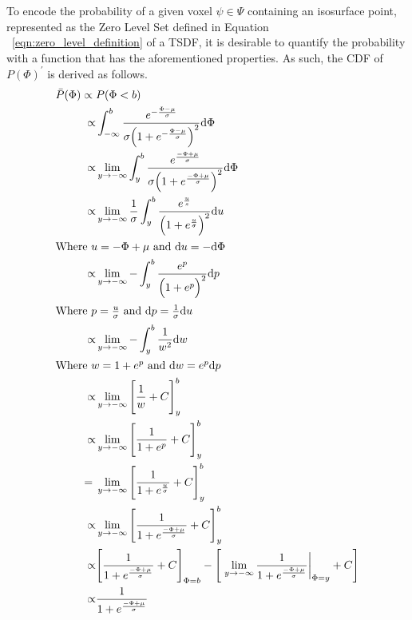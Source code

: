 To encode the probability of a given voxel \( \psi \in \Psi \) containing an
isosurface point, represented as the Zero Level Set defined in Equation
~\ref{eqn:zero_level_definition} of a TSDF, it is desirable to quantify the
probability with a function that has the aforementioned properties. As such, the
CDF of \(P{(\Phi)}^{\prime}\) is derived as follows.
\begin{align}
  \label{eqn:probobj_surface_prior_cdf}
  \bar{P}(\Phi) \propto{}& P(\Phi < b)\\
  \propto& \int_{-\infty}^{b} \frac
  {e^{-\frac{\Phi - \mu}{\sigma}}}
  {\sigma {\Big( 1 + e^{-\frac{\Phi - \mu}{\sigma}} \Big)}^{2}} {\mathrm d{\Phi}}\\
  \propto& \lim_{y\to -\infty} \int_{y}^{b} \frac
  {e^{\frac{-\Phi + \mu}{\sigma}}}
  {\sigma {\Big( 1 + e^{\frac{-\Phi + \mu}{\sigma}} \Big)}^{2}} {\mathrm d{\Phi}}\\
  \propto& \lim_{y\to -\infty} \frac{1}{\sigma} \int_{y}^{b}
  \frac{e^{\frac{u}{s}}}{{\Big( 1 + e^{\frac{u}{\sigma}} \Big)}^{2}} {\mathrm d{u}}\\
  \shortintertext{Where \( u = -\Phi + \mu \) and \({\mathrm d{u}} = -{\mathrm d{\Phi}}\)}
  \propto& \lim_{y\to -\infty} -\int_{y}^{b}
  \frac{e^{p}}{{\Big( 1 + e^{p} \Big)}^{2}} {\mathrm d{p}}\\
  \shortintertext{Where \(p = \frac{u}{\sigma}\) and \({\mathrm d{p}} = \frac{1}{\sigma} {\mathrm d{u}}\)}
  \propto& \lim_{y\to -\infty} -\int_{y}^{b} \frac{1}{w^{2}} {\mathrm d{w}}\\
  \shortintertext{Where \(w = 1 + e^{p}\) and \({\mathrm d{w}} = e^{p} {\mathrm d{p}}\)}
  \propto& \lim_{y\to -\infty} {\Bigg[ \frac{1}{w} + C \Bigg]}_{y}^{b}\\
  \propto& \lim_{y\to -\infty} {\Bigg[ \frac{1}{1 + e^{p}} + C \Bigg]}_{y}^{b}\\
  ={}& \lim_{y\to -\infty} {\Bigg[ \frac{1}{1 +e^{\frac{u}{\sigma}}} + C
  \Bigg]}_{y}^{b}\\
  \propto& \lim_{y\to -\infty} {\Bigg[ \frac{1}{1 + e^{\frac{-\Phi + \mu}{\sigma}}} +
  C \Bigg]}_{y}^{b}\\
  \propto& {\Bigg[ \frac{1}{1 + e^{\frac{-\Phi + \mu}{\sigma}}} + C \Bigg]}_{\Phi = b}
  - \Bigg[ \left. \lim_{y\to -\infty} \frac{1}{1 + e^{\frac{-\Phi + \mu}{\sigma}}}
  \right\rvert_{\Phi = y} + C \Bigg]\\
  \propto& \frac{1}{1 + e^{\frac{-\Phi + \mu}{\sigma}}}
\end{align}


